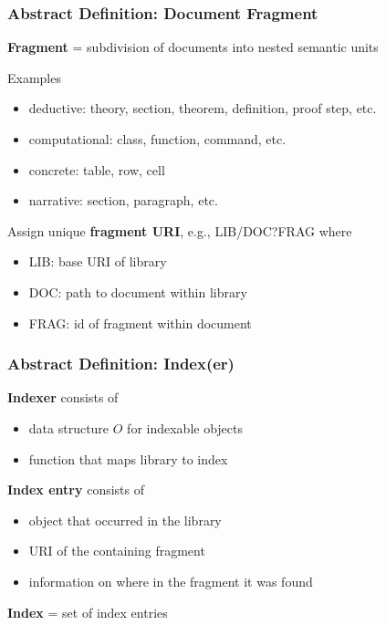 \begin{frame}\frametitle{Abstract Definition: Document Fragment}
\textbf{Fragment} = subdivision of documents into nested semantic units

Examples
\begin{itemize}
\item deductive: theory, section, theorem, definition, proof step, etc.
\item computational: class, function, command, etc.
\item concrete: table, row, cell
\item narrative: section, paragraph, etc.
\end{itemize}

Assign unique \textbf{fragment URI}, e.g., LIB/DOC?FRAG where
\begin{itemize}
\item LIB: base URI of library 
\item DOC: path to document within library 
\item FRAG: id of fragment within document 
\end{itemize}
\end{frame}

\begin{frame}\frametitle{Abstract Definition: Index(er)}
\textbf{Indexer} consists of
\begin{itemize}
\item data structure $O$ for indexable objects
\item function that maps library to index 
\end{itemize}

\textbf{Index entry} consists of
\begin{itemize}
\item object that occurred in the library
\item URI of the containing fragment
\item information on where in the fragment it was found
\end{itemize}

\textbf{Index} = set of index entries
\end{frame}


